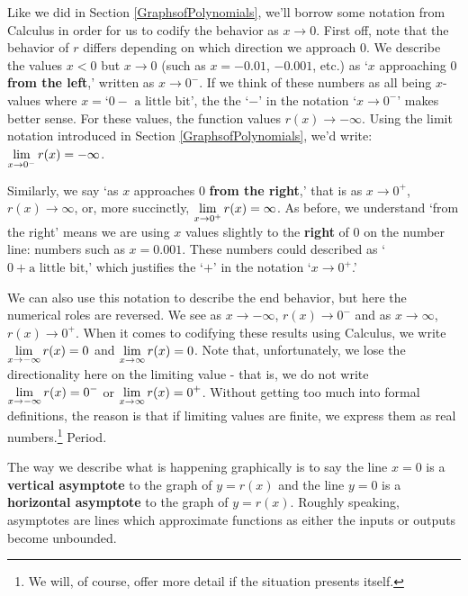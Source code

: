 Like we did in Section \ref{GraphsofPolynomials}, we'll borrow some notation from Calculus in order for us to codify the behavior as $x \rightarrow 0$.  First off, note that the behavior of $r$ differs depending on which direction we approach $0$.  We describe the values $x<0$ but $x \rightarrow 0$  (such as $x = -0.01$, $-0.001$, etc.)  as  `$x$ approaching $0$ \textbf{from the left},' written as $x \rightarrow 0^{-}$.  If we think of these numbers as all being $x$-values where  $x  = \text{`$0-$ a little bit'}$, the  the `$-$' in the notation `$x \rightarrow 0^{-}$' makes better sense.  For these values,  the function values $r(x) \rightarrow -\infty$.   Using the limit notation introduced in Section \ref{GraphsofPolynomials}, we'd write: $\ds{ \lim_{x \rightarrow 0^{-}} r(x) = - \infty}$.  


Similarly, we say `as $x$ approaches $0$ \textbf{from the right},' that is as $x \rightarrow 0^{+}$, $r(x) \rightarrow \infty$, or, more succinctly, $\ds{ \lim_{x \rightarrow 0^{+}} r(x) =  \infty}$.  As before, we understand `from the right' means we are using $x$ values slightly to the \textbf{right} of $0$ on the number line:  numbers such as $x =0.001.$ These numbers could described as `$0 + \text{a little bit}$,' which justifies the `$+$' in the notation `$x \rightarrow 0^{+}$.'

We can also use this notation to describe the end behavior, but here the numerical roles are reversed.  We see as $x \rightarrow -\infty$, $r(x) \rightarrow 0^{-}$ and as $x \rightarrow \infty$, $r(x) \rightarrow 0^{+}$.  When it comes to codifying these results using Calculus, we write $\ds{ \lim_{x \rightarrow -\infty} r(x) =  0}$ and $\ds{ \lim_{x \rightarrow \infty} r(x) =  0}$.  Note that, unfortunately, we lose the directionality here on the limiting value - that is, we do not write $\ds{ \lim_{x \rightarrow -\infty} r(x) =  0^{-}}$ or $\ds{ \lim_{x \rightarrow \infty} r(x) =  0^{+}}$.  Without getting too much into formal definitions, the reason is that if limiting values are finite, we express them as real numbers.\footnote{We will, of course, offer more detail if the situation presents itself.}  Period.

The way we describe what is happening graphically is to say the line $x = 0$ is a  \textbf{vertical asymptote}  to the graph of $y = r(x)$ and the line $y = 0$ is a \textbf{horizontal asymptote} to the graph of $y = r(x)$.  Roughly speaking, asymptotes are lines which approximate functions as either the inputs or outputs become unbounded. 

